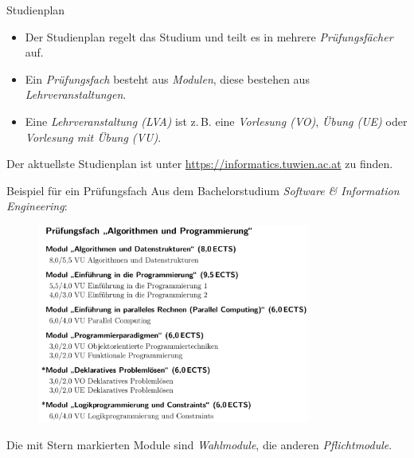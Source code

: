 \documentclass{beamer}
\begin{document}
\begin{frame}{Studienplan}
    \begin{itemize}
        \item Der Studienplan regelt das Studium und teilt es in mehrere
              \textit{Prüfungsfächer} auf.
        \item Ein \textit{Prüfungsfach} besteht aus \textit{Modulen}, diese
              bestehen aus \textit{Lehrveranstaltungen}.
        \item Eine \textit{Lehrveranstaltung (LVA)} ist z.\,B. eine
              \textit{Vorlesung (VO)}, \textit{Übung (UE)} oder
              \textit{Vorlesung mit Übung (VU)}.
    \end{itemize}
    Der aktuellste Studienplan ist unter \url{https://informatics.tuwien.ac.at} zu finden.
\end{frame}

\begin{frame}{Beispiel für ein Prüfungsfach}
    Aus dem Bachelorstudium \textit{Software \& Information Engineering}: \\
    \begin{figure}[htp]
        \centering
        \includegraphics[width=0.8\textwidth]{pruefungsfach.png}
    \end{figure}
    \small Die mit Stern markierten Module sind \textit{Wahlmodule}, die anderen
          \textit{Pflichtmodule}.
\end{frame}
\end{document}
